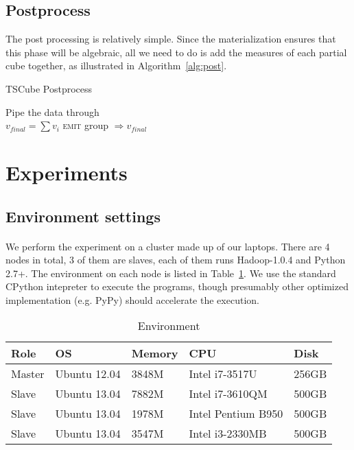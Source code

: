 \documentclass{article}
\begin{document}
\subsection{Postprocess}

The post processing is relatively simple. Since the materialization ensures that this phase will be algebraic, all we need to do is add the measures of each partial cube together, as illustrated in Algorithm~\ref{alg:post}.

\begin{algorithm}[H]
\centering
\caption{TSCube Postprocess}
\label{alg:post}
  \begin{algorithmic}[1]
      \State Pipe the data through
    \EndFunction
\\
      \State $v_{final} = \sum{v_{i}}$
      \State \textsc{emit} group $\Rightarrow v_{final}$
    \EndFunction
  \end{algorithmic}
\end{algorithm}

\section{Experiments}

\subsection{Environment settings}

\paragraph{}
We perform the experiment on a cluster made up of our laptops. There are 4 nodes in total, 3 of them are slaves, each of them runs Hadoop-1.0.4 and Python 2.7+. The environment on each node is listed in Table~\ref{table:env}. We use the standard CPython intepreter to execute the programs, though presumably other optimized implementation (e.g. PyPy) should accelerate the execution.

\begin{table}[h]
\centering
\begin{tabular}{l l l l l}
Role & OS & Memory & CPU & Disk \\
\hline
Master & Ubuntu 12.04 & 3848M & Intel i7-3517U & 256GB \\
Slave & Ubuntu 13.04  & 7882M & Intel i7-3610QM & 500GB \\
Slave & Ubuntu 13.04 & 1978M & Intel Pentium B950 & 500GB \\
Slave & Ubuntu 13.04 & 3547M & Intel i3-2330MB & 500GB
\end{tabular}

\caption{Environment}
\label{table:env}
\end{table}
\end{document}
